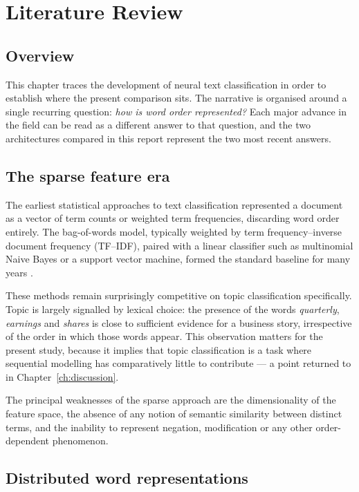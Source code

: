 \chapter{Literature Review}
\label{ch:literature}

\section{Overview}

This chapter traces the development of neural text classification in order to establish where the
present comparison sits. The narrative is organised around a single recurring question: \emph{how
is word order represented?} Each major advance in the field can be read as a different answer to
that question, and the two architectures compared in this report represent the two most recent
answers.

\section{The sparse feature era}

The earliest statistical approaches to text classification represented a document as a vector of
term counts or weighted term frequencies, discarding word order entirely. The bag-of-words model,
typically weighted by term frequency--inverse document frequency (TF--IDF), paired with a linear
classifier such as multinomial Naive Bayes or a support vector machine, formed the standard
baseline for many years \cite{joachims1998}.

These methods remain surprisingly competitive on topic classification specifically. Topic is
largely signalled by lexical choice: the presence of the words \emph{quarterly}, \emph{earnings}
and \emph{shares} is close to sufficient evidence for a business story, irrespective of the order
in which those words appear. This observation matters for the present study, because it implies
that topic classification is a task where sequential modelling has comparatively little to
contribute --- a point returned to in Chapter~\ref{ch:discussion}.

The principal weaknesses of the sparse approach are the dimensionality of the feature space, the
absence of any notion of semantic similarity between distinct terms, and the inability to
represent negation, modification or any other order-dependent phenomenon.

\section{Distributed word representations}

